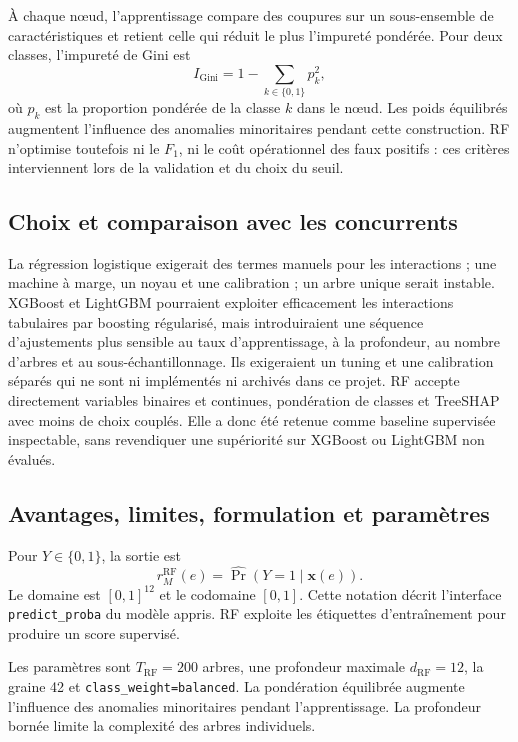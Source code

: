 \documentclass[11pt,a4paper,oneside]{report}
\theoremstyle{definition}
\theoremstyle{plain}
\begin{document}
À chaque nœud, l'apprentissage compare des coupures sur un sous-ensemble de
caractéristiques et retient celle qui réduit le plus l'impureté pondérée. Pour
deux classes, l'impureté de Gini est
\[
I_{\mathrm{Gini}}=1-\sum_{k\in\{0,1\}}p_k^2,
\]
où $p_k$ est la proportion pondérée de la classe $k$ dans le nœud. Les poids
équilibrés augmentent l'influence des anomalies minoritaires pendant cette
construction. RF n'optimise toutefois ni le $F_1$, ni le coût opérationnel des
faux positifs : ces critères interviennent lors de la validation et du choix
du seuil.

\subsection*{Choix et comparaison avec les concurrents}

La régression logistique exigerait des termes manuels pour les interactions ;
une machine à marge, un noyau et une calibration ; un arbre unique serait
instable. XGBoost et LightGBM pourraient exploiter efficacement les
interactions tabulaires par boosting régularisé, mais introduiraient une
séquence d'ajustements plus sensible au taux d'apprentissage, à la profondeur,
au nombre d'arbres et au sous-échantillonnage. Ils exigeraient un tuning et une
calibration séparés qui ne sont ni implémentés ni archivés dans ce projet. RF
accepte directement variables binaires et continues, pondération de classes et
TreeSHAP avec moins de choix couplés. Elle a donc été retenue comme baseline
supervisée inspectable, sans revendiquer une supériorité sur XGBoost ou
LightGBM non évalués.

\subsection*{Avantages, limites, formulation et paramètres}

Pour $Y\in\{0,1\}$, la sortie est
\begin{equation}
r_M^{\mathrm{RF}}(e)=\widehat{\Pr}(Y=1\mid\mathbf{x}(e)).
\label{eq:ai-ro-rf}
\end{equation}
Le domaine est $[0,1]^{12}$ et le codomaine $[0,1]$. Cette notation décrit l'interface
\texttt{predict\_proba} du modèle appris. RF exploite les étiquettes d'entraînement
pour produire un score supervisé.

Les paramètres sont $T_{\mathrm{RF}}=200$ arbres, une profondeur maximale
$d_{\mathrm{RF}}=12$, la graine 42 et \texttt{class\_weight=balanced}. La pondération
équilibrée augmente l'influence des anomalies minoritaires pendant l'apprentissage.
La profondeur bornée limite la complexité des arbres individuels.
\end{document}
